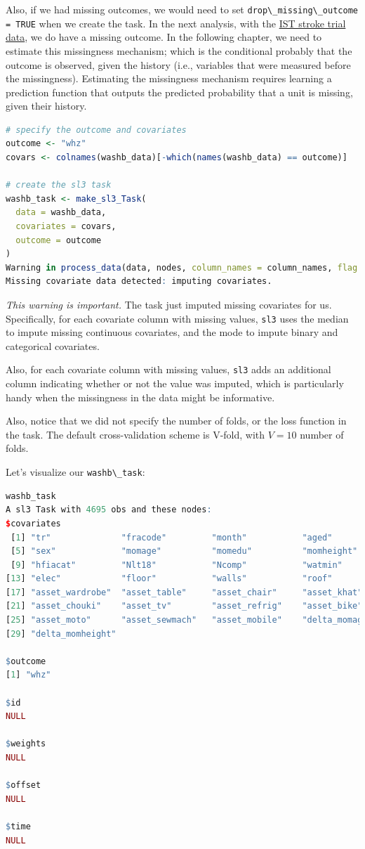 \documentclass[
  12pt, krantz2,
]{krantz}
\newcommand{\passthrough}[1]{#1}
\theoremstyle{definition}
\theoremstyle{definition}
\theoremstyle{definition}
\newcommand{\1}{\mathbbm{1}}
\begin{document}
Also, if we had missing outcomes, we would need to set \passthrough{\lstinline!drop\_missing\_outcome = TRUE!} when we create the task. In the next analysis, with the \protect\hyperlink{ist}{IST stroke trial
data}, we do have a missing outcome. In the following chapter, we need to
estimate this missingness mechanism; which is the conditional probably that
the outcome is observed, given the history (i.e., variables that were measured
before the missingness). Estimating the missingness mechanism requires learning
a prediction function that outputs the predicted probability that a unit
is missing, given their history.

\begin{lstlisting}[language=R]
# specify the outcome and covariates
outcome <- "whz"
covars <- colnames(washb_data)[-which(names(washb_data) == outcome)]

# create the sl3 task
washb_task <- make_sl3_Task(
  data = washb_data,
  covariates = covars,
  outcome = outcome
)
Warning in process_data(data, nodes, column_names = column_names, flag = flag, :
Missing covariate data detected: imputing covariates.
\end{lstlisting}

\emph{This warning is important.} The task just imputed missing covariates for us.
Specifically, for each covariate column with missing values, \passthrough{\lstinline!sl3!} uses the
median to impute missing continuous covariates, and the mode to impute binary
and categorical covariates.

Also, for each covariate column with missing values, \passthrough{\lstinline!sl3!} adds an additional
column indicating whether or not the value was imputed, which is particularly
handy when the missingness in the data might be informative.

Also, notice that we did not specify the number of folds, or the loss function
in the task. The default cross-validation scheme is V-fold, with \(V=10\) number
of folds.

Let's visualize our \passthrough{\lstinline!washb\_task!}:

\begin{lstlisting}[language=R]
washb_task
A sl3 Task with 4695 obs and these nodes:
$covariates
 [1] "tr"              "fracode"         "month"           "aged"           
 [5] "sex"             "momage"          "momedu"          "momheight"      
 [9] "hfiacat"         "Nlt18"           "Ncomp"           "watmin"         
[13] "elec"            "floor"           "walls"           "roof"           
[17] "asset_wardrobe"  "asset_table"     "asset_chair"     "asset_khat"     
[21] "asset_chouki"    "asset_tv"        "asset_refrig"    "asset_bike"     
[25] "asset_moto"      "asset_sewmach"   "asset_mobile"    "delta_momage"   
[29] "delta_momheight"

$outcome
[1] "whz"

$id
NULL

$weights
NULL

$offset
NULL

$time
NULL
\end{lstlisting}
\end{document}
